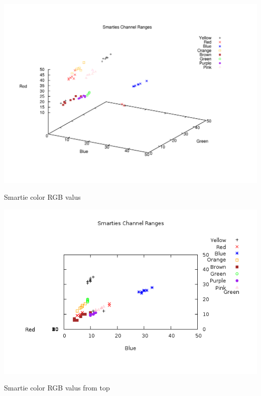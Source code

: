 \begin{Image}
\begin{center}
\includegraphics[width=\textwidth]{plot_tilted.png}\caption{Smartie color RGB valus}
\end{center}
\end{Image}
 \begin{Image}
\begin{center}
\includegraphics[width=\textwidth]{plot_top.png}\caption{Smartie color RGB valus from top}
\end{center}
\end{Image}
